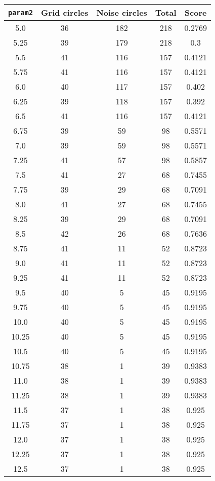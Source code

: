 \documentclass[letterpaper, 12pt]{article}
\begin{document}
\begin{longtable}{|c|c|c|c|c|}
\hline
\textbf{\texttt{param2}} & \textbf{Grid circles} & \textbf{Noise circles} & \textbf{Total} & \textbf{Score} \\
\hline
5.0 & 36 & 182 & 218 & 0.2769 \\
\hline
5.25 & 39 & 179 & 218 & 0.3 \\
\hline
5.5 & 41 & 116 & 157 & 0.4121 \\
\hline
5.75 & 41 & 116 & 157 & 0.4121 \\
\hline
6.0 & 40 & 117 & 157 & 0.402 \\
\hline
6.25 & 39 & 118 & 157 & 0.392 \\
\hline
6.5 & 41 & 116 & 157 & 0.4121 \\
\hline
6.75 & 39 & 59 & 98 & 0.5571 \\
\hline
7.0 & 39 & 59 & 98 & 0.5571 \\
\hline
7.25 & 41 & 57 & 98 & 0.5857 \\
\hline
7.5 & 41 & 27 & 68 & 0.7455 \\
\hline
7.75 & 39 & 29 & 68 & 0.7091 \\
\hline
8.0 & 41 & 27 & 68 & 0.7455 \\
\hline
8.25 & 39 & 29 & 68 & 0.7091 \\
\hline
8.5 & 42 & 26 & 68 & 0.7636 \\
\hline
8.75 & 41 & 11 & 52 & 0.8723 \\
\hline
9.0 & 41 & 11 & 52 & 0.8723 \\
\hline
9.25 & 41 & 11 & 52 & 0.8723 \\
\hline
9.5 & 40 & 5 & 45 & 0.9195 \\
\hline
9.75 & 40 & 5 & 45 & 0.9195 \\
\hline
10.0 & 40 & 5 & 45 & 0.9195 \\
\hline
10.25 & 40 & 5 & 45 & 0.9195 \\
\hline
10.5 & 40 & 5 & 45 & 0.9195 \\
\hline
10.75 & 38 & 1 & 39 & 0.9383 \\
\hline
11.0 & 38 & 1 & 39 & 0.9383 \\
\hline
11.25 & 38 & 1 & 39 & 0.9383 \\
\hline
11.5 & 37 & 1 & 38 & 0.925 \\
\hline
11.75 & 37 & 1 & 38 & 0.925 \\
\hline
12.0 & 37 & 1 & 38 & 0.925 \\
\hline
12.25 & 37 & 1 & 38 & 0.925 \\
\hline
12.5 & 37 & 1 & 38 & 0.925 \\

\end{longtable}
\end{document}

